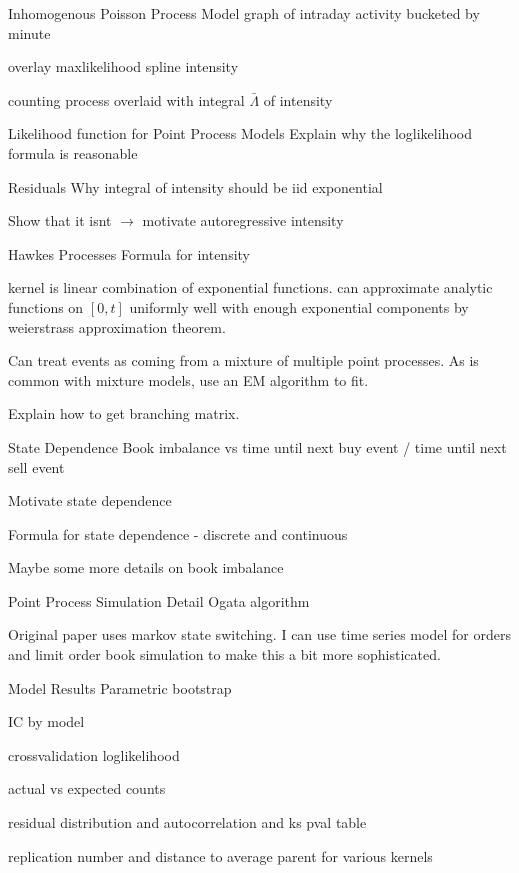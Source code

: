 \documentclass[usenames,dvipsnames,handout]{beamer}
\begin{document}
\begin{frame}{Inhomogenous Poisson Process Model}
	graph of intraday activity bucketed by minute

	overlay maxlikelihood spline intensity

	counting process overlaid with integral $\bar{\Lambda}$ of intensity
\end{frame}

\begin{frame}{Likelihood function for Point Process Models}
	Explain why the loglikelihood formula is reasonable
\end{frame}

\begin{frame}{Residuals}
	Why integral of intensity should be iid exponential

	Show that it isnt $\to$ motivate autoregressive intensity
\end{frame}

\begin{frame}{Hawkes Processes}
	Formula for intensity

	kernel is linear combination of exponential functions. can approximate analytic functions on $[0,t]$ uniformly well with enough exponential components by weierstrass approximation theorem.

	Can treat events as coming from a mixture of multiple point processes. As is common with mixture models, use an EM algorithm to fit.

	Explain how to get branching matrix.
\end{frame}

\begin{frame}{State Dependence}
	Book imbalance vs time until next buy event / time until next sell event

	Motivate state dependence

	Formula for state dependence - discrete and continuous

	Maybe some more details on book imbalance
\end{frame}

\begin{frame}{Point Process Simulation}
	Detail Ogata algorithm

	Original paper uses markov state switching. I can use time series model for orders and limit order book simulation to make this a bit more sophisticated.
\end{frame}

\begin{frame}{Model Results}
	Parametric bootstrap

	IC by model

	crossvalidation loglikelihood

	actual vs expected counts

	residual distribution and autocorrelation and ks pval table

	replication number and distance to average parent for various kernels
\end{frame}
\end{document}
